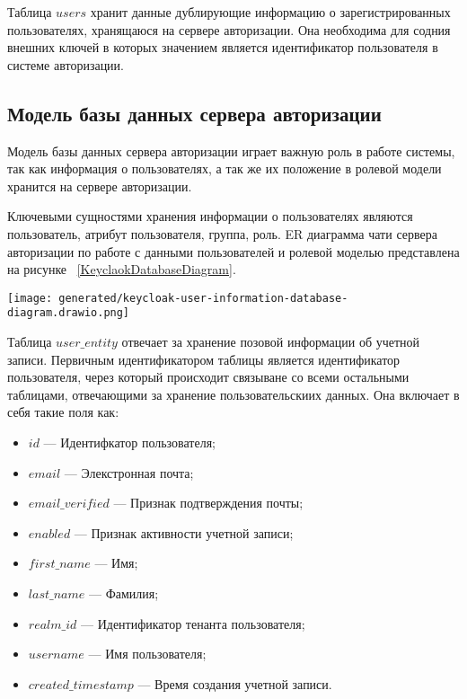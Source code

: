 Таблица $users$ хранит данные дублирующие информацию о зарегистрированных пользователях, хранящаюся на сервере авторизации. Она необходима для содния внешних ключей в которых значением является идентификатор пользователя в системе авторизации.

\subsection{Модель базы данных сервера авторизации}

Модель базы данных сервера авторизации играет важную роль в работе системы, так как информация о пользователях, а так же их положение в ролевой модели хранится на сервере авторизации.

Ключевыми сущностями хранения информации о пользователях являются пользователь, атрибут пользователя, группа, роль. ER диаграмма чати сервера авторизации по работе с данными пользователей и ролевой моделью представлена на рисунке ~\ref{KeyclaokDatabaseDiagram}.

\begin{figure*}[!t]
  \centering
  \texttt{[image: generated/keycloak-user-information-database-diagram.drawio.png]}
  \caption{Модель хранения данных пользователей на сервере авторизации}
  \label{KeyclaokDatabaseDiagram}
\end{figure*}

Таблица $user\_entity$ отвечает за хранение позовой информации об учетной записи. Первичным идентификатором таблицы является идентификатор пользователя, через который происходит связыване со всеми остальными таблицами, отвечающими за хранение пользовательскиих данных. Она включает в себя такие поля как:

\begin{itemize}
  \item[---]$id$ --- Идентифкатор пользователя;
  \item[---]$email$ --- Элекстронная почта;
  \item[---]$email\_verified$ --- Признак подтверждения почты;
  \item[---]$enabled$ --- Признак активности учетной записи;
  \item[---]$first\_name$ --- Имя;
  \item[---]$last\_name$ --- Фамилия;
  \item[---]$realm\_id$ --- Идентификатор тенанта пользователя;
  \item[---]$username$ --- Имя пользователя;
  \item[---]$created\_timestamp$ --- Время создания учетной записи.
\end{itemize}

